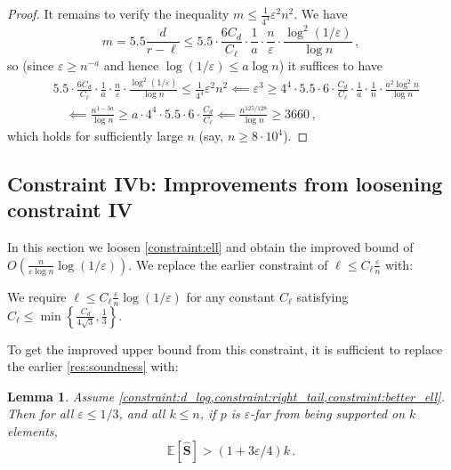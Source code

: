 \documentclass[10pt,a4paper]{article}
\newtheorem{lemma}{Lemma}[section]
\newcommand{\Ex}[1]{\bE \left[ #1 \right]}
\newcommand{\bE}{\ensuremath{\mathbb{E}}}
\renewcommand{\epsilon}{\varepsilon}
\begin{document}
\begin{proof}
    It remains to verify the inequality $m \leq \frac{1}{4^4} \epsilon^2 n^2$. We have
    \[
        m = 5.5 \frac{d}{r-\ell}
        \le 5.5 \cdot \frac{6 C_d}{C_\ell} \cdot \frac{1}{a} \cdot \frac{n}{\epsilon}
            \cdot \frac{\log^2(1/\epsilon)}{\log n} \,,
    \]
    so (since $\epsilon \geq n^{-a}$ and hence $\log(1/\epsilon) \le a \log n$) it suffices to have
    \begin{align*}
        &5.5 \cdot \frac{6 C_d}{C_\ell} \cdot \frac{1}{a} \cdot \frac{n}{\epsilon}
                \cdot \frac{\log^2(1/\epsilon)}{\log n}
            \le \frac{1}{4^4} \epsilon^2 n^2
        \impliedby
            \epsilon^3 \geq 4^4 \cdot 5.5 \cdot 6 \cdot \frac{C_d}{C_\ell} \cdot \frac{1}{a}
            \cdot \frac{1}{n} \cdot \frac{a^2 \log^2 n}{\log n}
        \\
        &\quad \impliedby
            \frac{n^{1-3a}}{\log n} \geq a \cdot 4^4 \cdot 5.5 \cdot 6 \cdot \frac{C_d}{C_\ell}
        \impliedby \frac{n^{125/128}}{\log n} \ge 3660 \,,
    \end{align*}
    which holds for sufficiently large $n$ (say, $n \ge 8 \cdot 10^4$).
\end{proof}

\subsection{Constraint IVb: Improvements from loosening constraint IV}
\label{section:improved-bound}

In this section we loosen \cref{constraint:ell} and obtain the improved bound of
$O\left(\tfrac{n}{\epsilon \log n}\log(1/\epsilon)\right)$. We replace the earlier constraint of
$\ell \leq C_\ell \tfrac{\epsilon}{n}$ with:

\begin{constraint}
\label{constraint:better_ell}
We require $\ell \leq C_\ell \tfrac{\epsilon}{n} \log(1/\epsilon)$ for any constant $C_\ell$
satisfying $C_\ell \leq \min\left\{\frac{C_d}{4\sqrt{3}}, \frac{1}{3}\right\}$.
\end{constraint}

To get the improved upper bound from this constraint, it is sufficient to replace the earlier
\cref{res:soundness} with:

\begin{lemma}
    \label{res:soundness_improved}
    Assume \cref{constraint:d_log,constraint:right_tail,constraint:better_ell}.  Then for all
    $\epsilon \leq 1/3$, and all $k \leq n$, if $p$ is $\epsilon$-far from being supported on $k$
    elements,
    \[
        \Ex{\bm{\widehat S}} > (1 + 3\epsilon/4) k \,.
    \]
\end{lemma}
\end{document}
